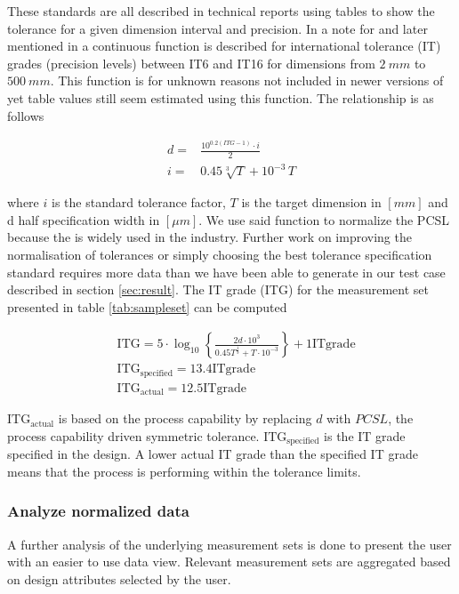 \documentclass[aip,amsmath, reprint, author-year]{revtex4-1}
\begin{document}
These standards are all described in technical reports using tables to show the tolerance for a given dimension interval and precision. In a note for \citeauthor{american1978preferred} and later mentioned in \citeauthor{ISO286} a continuous function is described for international tolerance (IT) grades (precision levels) between IT6 and IT16 for dimensions from $2 \ mm$ to $500 \ mm$. This function is for unknown reasons not included in newer versions of \citeauthor{ISO286} yet table values still seem estimated using this function. The relationship is as follows

\begin{align}
	d=& \frac{10^{0.2 (ITG -1)} \cdot i}{2} \\
	i =& 0.45 \sqrt[3]{T} + 10^{-3} \, T 
\end{align}

where $i$ is the standard tolerance factor, $T$ is the target dimension in $[mm]$ and d half specification width in $[\mu m]$. We use said function to normalize the PCSL because the \citeauthor{ISO286}  is widely used in the industry. Further work on improving the normalisation of tolerances or simply choosing the best tolerance specification standard requires more data than we have been able to generate in our test case described in section \ref{sec:result}. The IT grade (ITG) for the measurement set presented in table \ref{tab:sampleset} can be computed

\begin{align*}
&\mathrm{ITG} = 5 \cdot \log_{10} \left\{ \frac{2d \cdot 10^3}{ 0.45  T^{\frac{1}{3}} + T \cdot10^{-3} }\right\} +1 \mathrm{IT grade}\\
&\mathrm{ITG_{specified} } = 13.4 \mathrm{IT grade}\\
&\mathrm{ITG_{actual}}  = 12.5 \mathrm{IT grade}
\end{align*}

$\mathrm{ITG_{actual}}$ is based on the process capability by replacing $d$ with $PCSL$, the process capability driven symmetric tolerance. $\mathrm{ITG_{specified}}$ is the IT grade specified in the design. A lower actual IT grade than the specified IT grade means that the process is performing within the tolerance limits.

\subsubsection{Analyze normalized data}
A further analysis of the underlying measurement sets is done to present the user with an easier to use data view. Relevant measurement sets are aggregated based on design attributes selected by the user.
\end{document}
